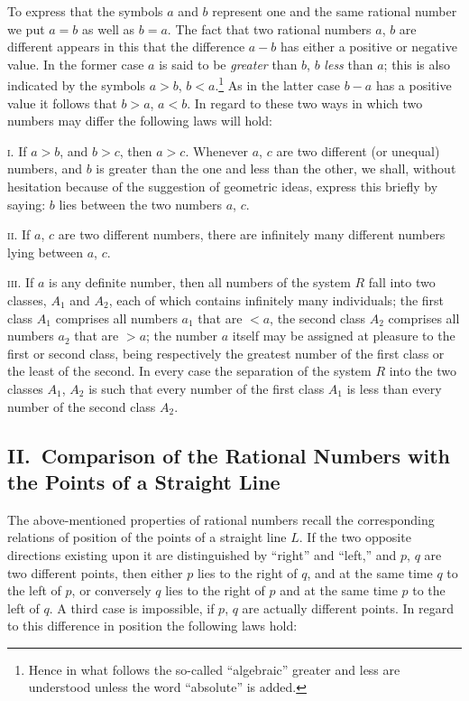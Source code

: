 \documentclass[polutonikogreek,english,twoside,openright]{article}
\begin{document}
To express that the symbols $a$ and $b$ represent one and the same
rational number we put $a = b$ as well as $b = a$. The fact that two
rational numbers $a$, $b$ are different appears in this that the
difference $a - b$ has either a positive or negative value. In the
former case $a$ is said to be \textit{greater} than $b$, $b$
\textit{less} than $a$; this is also indicated by the symbols $a > b$,
$b < a$.\footnote{Hence in what follows the so-called ``algebraic''
  greater and less are understood unless the word ``absolute'' is
  added.} As in the latter case $b - a$ has a positive value it
follows that $b > a$, $a < b$. In regard to these two ways in which
two numbers may differ the following laws will hold:

\textsc{i.} If $a > b$, and $b > c$, then $a > c$. Whenever $a$, $c$
are two different (or unequal) numbers, and $b$ is greater than the
one and less than the other, we shall, without hesitation because of
the suggestion of geometric ideas, express this briefly by saying: $b$
lies between the two numbers $a$, $c$.

\textsc{ii.} If $a$, $c$ are two different numbers, there are
infinitely many different numbers lying between $a$, $c$.

\textsc{iii.} If $a$ is any definite number, then all numbers of the
system $R$ fall into two classes, $A_1$ and $A_2$, each of which
contains infinitely many individuals; the first class $A_1$ comprises
all numbers $a_1$ that are $< a$, the second class $A_2$ comprises all
numbers $a_2$ that are $> a$; the number $a$ itself may be assigned at
pleasure to the first or second class, being respectively the greatest
number of the first class or the least of the second. In every case
the separation of the system $R$ into the two classes $A_1$, $A_2$ is
such that every number of the first class $A_1$ is less than every
number of the second class $A_2$.

\subsection*{II.\ Comparison of the Rational Numbers with the Points
  of a Straight Line}

The above-mentioned properties of rational numbers recall the
corresponding relations of position of the points of a straight line
$L$. If the two opposite directions existing upon it are distinguished
by ``right'' and ``left,'' and $p$, $q$ are two different points, then
either $p$ lies to the right of $q$, and at the same time $q$ to the
left of $p$, or conversely $q$ lies to the right of $p$ and at the
same time $p$ to the left of $q$. A third case is impossible, if $p$,
$q$ are actually different points.  In regard to this difference in
position the following laws hold:
\end{document}
